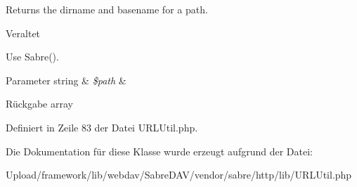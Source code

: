 Returns the \textquotesingle{}dirname\textquotesingle{} and \textquotesingle{}basename\textquotesingle{} for a path.

\begin{DoxyRefDesc}{Veraltet}
\item[\mbox{\hyperlink{deprecated__deprecated000054}{Veraltet}}]Use Sabre(). \end{DoxyRefDesc}

\begin{DoxyParams}[1]{Parameter}
string & {\em \$path} & \\
\hline
\end{DoxyParams}
\begin{DoxyReturn}{Rückgabe}
array 
\end{DoxyReturn}


Definiert in Zeile 83 der Datei U\+R\+L\+Util.\+php.



Die Dokumentation für diese Klasse wurde erzeugt aufgrund der Datei\+:\begin{DoxyCompactItemize}
\item 
Upload/framework/lib/webdav/\+Sabre\+D\+A\+V/vendor/sabre/http/lib/U\+R\+L\+Util.\+php\end{DoxyCompactItemize}
